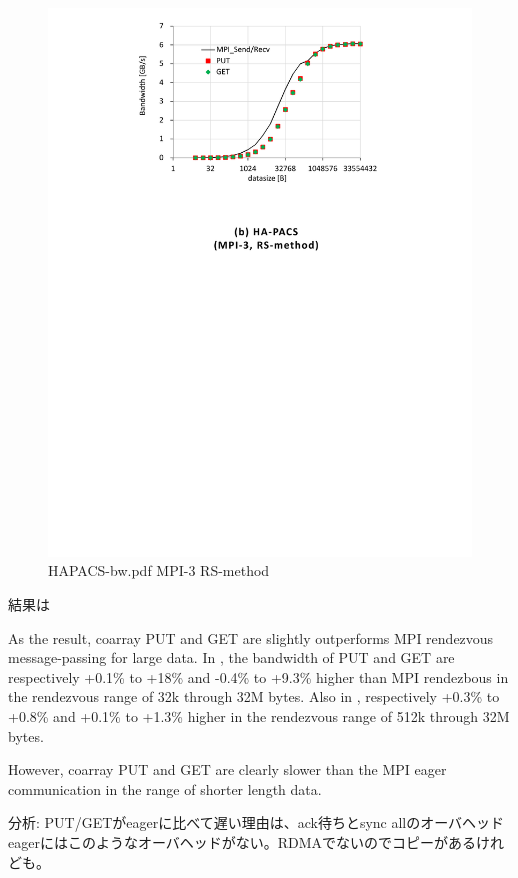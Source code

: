\begin{figure}
\begin{center}
    \mbox{\includegraphics[trim=45mm 188mm 45mm 3mm, scale=0.7,clip]{figs/HAPACS-bw.pdf}}
    \caption{HAPACS-bw.pdf MPI-3 RS-method}\label{fig:HAPACS-bw}
  \end{center}
\end{figure}

結果は

As the result, coarray PUT and GET are slightly outperforms MPI rendezvous 
message-passing for large data.
In , the bandwidth of PUT and GET are respectively 
+0.1\% to +18\% and -0.4\% to +9.3\% higher than MPI rendezbous in the 
rendezvous range of 32k through 32M bytes.
Also in , respectively +0.3\% to +0.8\% and 
+0.1\% to +1.3\% higher in the rendezvous range of 512k through 32M bytes.

However, coarray PUT and GET are clearly slower than the MPI eager 
communication in the range of shorter length data.

分析:
PUT/GETがeagerに比べて遅い理由は、ack待ちとsync allのオーバヘッド
eagerにはこのようなオーバヘッドがない。RDMAでないのでコピーがあるけれども。



